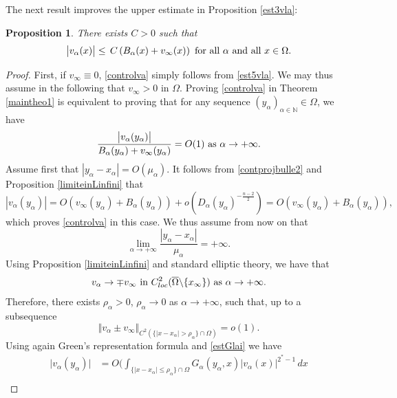 \documentclass[10pt]{amsart}
\numberwithin{equation}{section}
\newcommand{\Om}{\Omega}
\newcommand{\ma}{\mu_\alpha}
\def \bb{\hbox}
\def \vv {\mathbb{\Vert}}
\def \xl{x_\alpha}
\def \ls{+\infty}
\def\la{\alpha}
\def \ma{\mu_{\alpha}}
\def \yl{y_{\alpha}}
\def \vo {v_{\infty}}
\def \nn{\mathbb{N}}
\def \xin{x_{\infty}}
\def \ro{\rho}
\theoremstyle{plain}
\newtheorem{prop}{Proposition}[section]%
\theoremstyle{remark}
\begin{document}
The next result improves the upper estimate in Proposition \ref{est3vla}: 

\begin{prop}
There exists $C>0$ such that 
\begin{equation}\label{controlva}
		\big| v_{\la}(x)\big| \leq \, C\left(  B_{\alpha}(x)+\vo(x)\right) \bb{ for all } \alpha \bb{ and all } x\in \Om.
	\end{equation}
\end{prop}

\begin{proof}
First, if $v_\infty \equiv 0$, \eqref{controlva} simply follows from \eqref{est5vla}. We may thus assume in the following that $v_\infty >0$ in $\Om$.
Proving  \eqref{controlva} in Theorem \ref{maintheo1} is equivalent to proving that for any sequence $(\yl)_{\alpha\in\nn}\in \Om$, we have
			\begin{equation}\label{fracvlaO1+}
				\frac{\big|v_{\la}(\yl)\big|}{B_{\alpha}(\yl)+\vo(\yl)}=O(1) \bb{ as } \la \to \ls.
			\end{equation}
Assume first that $|\yl-\xl|=O(\ma)$. It follows from \eqref{contprojbulle2} and Proposition \ref{limiteinLinfini} that 
\begin{equation*}
\left| v_\la(\yl)\right| =O\left(\vo(\yl)+ B_\la(\yl)\right) +o\left( D_\la(\yl)^{-\frac{n-2}{2}}\right) =  O\left(\vo(\yl)+ B_\la(\yl)\right),
\end{equation*}
which proves \eqref{controlva} in this case. We thus assume from now on that 
\begin{equation}\label{limDlama}
\lim_{\la\to\ls} \frac{|\yl-\xl|}{\ma}=+\infty.
\end{equation}
Using Proposition \ref{limiteinLinfini} and standard elliptic theory, we have that
\begin{equation}\label{vatou0}
v_\la\to \mp\vo \bb{ in }C_{loc}^2(\overline{\Om}\backslash \{\xin\})  \bb{ as } \la\to \ls.
\end{equation}
Therefore, there exists $\ro_\la>0$, $\ro_\la \to 0$ as $\la\to \ls$, such that, up to a subsequence 
\begin{equation}\label{limvlau0C2}
\vv v_{\la}\pm\vo\vv_{C^2(\{|x-\xl|> \ro_\la\}\cap\Om)}=o(1).
\end{equation}
 Using again Green's representation formula and \eqref{estGlai} we have 
\begin{equation} \label{reprefinaleTh1}
\begin{aligned}
\big| v_{\la}(\yl)\big|  
& = O\Bigg( \int_{\{|x-\xl|\leq \ro_\la\}\cap\Om} G_{\la}(\yl,x)|v_{\la}(x)|^{2^*-1}\, dx \\

\end{aligned}
\end{equation}
\end{proof}
\end{document}
